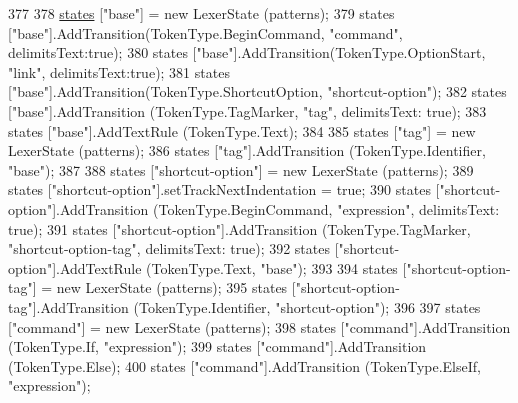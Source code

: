 \begin{DoxyCode}
{377 
378             \hyperlink{a00121_a2c65c0ba90f973e459583badefef216a}{states} [\textcolor{stringliteral}{"base"}] = \textcolor{keyword}{new} LexerState (patterns);
379             states [\textcolor{stringliteral}{"base"}].AddTransition(TokenType.BeginCommand, \textcolor{stringliteral}{"command"}, delimitsText:\textcolor{keyword}{true});
380             states [\textcolor{stringliteral}{"base"}].AddTransition(TokenType.OptionStart, \textcolor{stringliteral}{"link"}, delimitsText:\textcolor{keyword}{true});
381             states [\textcolor{stringliteral}{"base"}].AddTransition(TokenType.ShortcutOption, \textcolor{stringliteral}{"shortcut-option"});
382             states [\textcolor{stringliteral}{"base"}].AddTransition (TokenType.TagMarker, \textcolor{stringliteral}{"tag"}, delimitsText: \textcolor{keyword}{true});
383             states [\textcolor{stringliteral}{"base"}].AddTextRule (TokenType.Text);
384 
385             states [\textcolor{stringliteral}{"tag"}] = \textcolor{keyword}{new} LexerState (patterns);
386             states [\textcolor{stringliteral}{"tag"}].AddTransition (TokenType.Identifier, \textcolor{stringliteral}{"base"});
387 
388             states [\textcolor{stringliteral}{"shortcut-option"}] = \textcolor{keyword}{new} LexerState (patterns);
389             states [\textcolor{stringliteral}{"shortcut-option"}].setTrackNextIndentation = \textcolor{keyword}{true};
390             states [\textcolor{stringliteral}{"shortcut-option"}].AddTransition (TokenType.BeginCommand, \textcolor{stringliteral}{"expression"}, delimitsText: \textcolor{keyword}{
      true});
391             states [\textcolor{stringliteral}{"shortcut-option"}].AddTransition (TokenType.TagMarker, \textcolor{stringliteral}{"shortcut-option-tag"}, 
      delimitsText: \textcolor{keyword}{true});
392             states [\textcolor{stringliteral}{"shortcut-option"}].AddTextRule (TokenType.Text, \textcolor{stringliteral}{"base"});
393 
394             states [\textcolor{stringliteral}{"shortcut-option-tag"}] = \textcolor{keyword}{new} LexerState (patterns);
395             states [\textcolor{stringliteral}{"shortcut-option-tag"}].AddTransition (TokenType.Identifier, \textcolor{stringliteral}{"shortcut-option"});
396 
397             states [\textcolor{stringliteral}{"command"}] = \textcolor{keyword}{new} LexerState (patterns);
398             states [\textcolor{stringliteral}{"command"}].AddTransition (TokenType.If, \textcolor{stringliteral}{"expression"});
399             states [\textcolor{stringliteral}{"command"}].AddTransition (TokenType.Else);
400             states [\textcolor{stringliteral}{"command"}].AddTransition (TokenType.ElseIf, \textcolor{stringliteral}{"expression"});
}
\end{DoxyCode}
